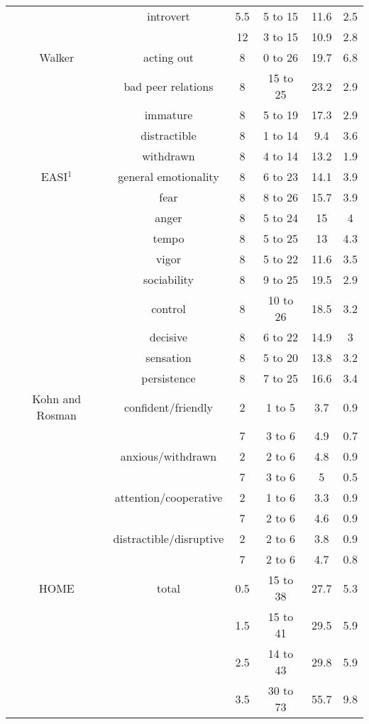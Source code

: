 \begin{ThreePartTable}
\begin{longtable}{c c c c c c}
        & introvert & 5.5 & 5 to 15 & 11.6 & 2.5 \\
        & & 12 & 3 to 15 & 10.9 & 2.8 \\
      \midrule
        Walker & acting out & 8 & 0 to 26 & 19.7 & 6.8 \\
        & bad peer relations & 8 & 15 to 25 & 23.2 & 2.9 \\
        & immature & 8 & 5 to 19 & 17.3 & 2.9 \\
        & distractible & 8 & 1 to 14 & 9.4 & 3.6 \\
        & withdrawn & 8 & 4 to 14 & 13.2 & 1.9 \\
      \midrule
        EASI$^1$ & general emotionality & 8 & 6 to 23 & 14.1 & 3.9 \\
        & fear & 8 & 8 to 26 & 15.7 & 3.9 \\
        & anger & 8 & 5 to 24 & 15 & 4 \\
        & tempo & 8 & 5 to 25 & 13 & 4.3 \\
        & vigor & 8 & 5 to 22 & 11.6 & 3.5 \\
        & sociability & 8 & 9 to 25 & 19.5 & 2.9 \\
        & control & 8 & 10 to 26 & 18.5 & 3.2 \\
        & decisive & 8 & 6 to 22 & 14.9 & 3 \\
        & sensation & 8 & 5 to 20 & 13.8 & 3.2 \\
        & persistence & 8 & 7 to 25 & 16.6 & 3.4 \\
      \midrule
        Kohn and Rosman & confident/friendly & 2 & 1 to 5 & 3.7 & 0.9 \\
        & & 7 & 3 to 6 & 4.9 & 0.7 \\
        & anxious/withdrawn & 2 & 2 to 6 & 4.8 & 0.9 \\
        & & 7 & 3 to 6 & 5 & 0.5 \\
        & attention/cooperative & 2 & 1 to 6 & 3.3 & 0.9 \\
        & & 7 & 2 to 6 & 4.6 & 0.9 \\
        & distractible/disruptive & 2 & 2 to 6 & 3.8 & 0.9 \\
        & & 7 & 2 to 6 & 4.7 & 0.8 \\
      \midrule
        HOME & total & 0.5 & 15 to 38 & 27.7 & 5.3 \\
        & & 1.5 & 15 to 41 & 29.5 & 5.9 \\
        & & 2.5 & 14 to 43 & 29.8 & 5.9 \\
        & & 3.5 & 30 to 73 & 55.7 & 9.8 \\

\end{longtable}
\end{ThreePartTable}
